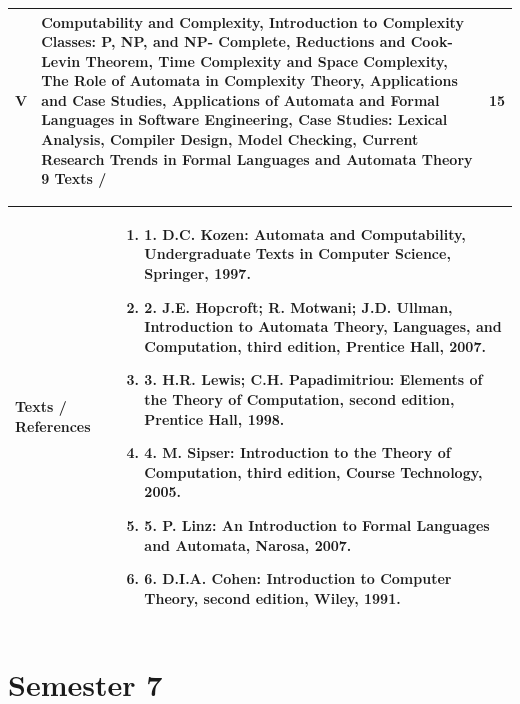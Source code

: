 \documentclass[11pt,a4paper]{article}
\begin{document}
\begin{tabularx}{\textwidth}{|>{\centering\arraybackslash}p{1.4cm}|X|>{\centering\arraybackslash}p{2.4cm}|}
\hline
\Large \textbf{V} & Computability and Complexity, Introduction to Complexity Classes: P, NP, and NP- Complete, Reductions and Cook-Levin Theorem, Time Complexity and Space Complexity, The Role of Automata in Complexity Theory, Applications and Case Studies, Applications of Automata and Formal Languages in Software Engineering, Case Studies: Lexical Analysis, Compiler Design, Model Checking, Current Research Trends in Formal Languages and Automata Theory 9 Texts / & \Large \textbf{15} \\
\hline
\end{tabularx}
\vspace{8pt}
\renewcommand{\arraystretch}{1.3}
\begin{tabularx}{\textwidth}{|p{3.2cm}|X|}
\hline
\textbf{Texts / References} & \begin{enumerate}[leftmargin=*,noitemsep,topsep=2pt]  \item 1. D.C. Kozen: Automata and Computability, Undergraduate Texts in Computer Science,  Springer, 1997.  \item 2. J.E. Hopcroft; R. Motwani; J.D. Ullman, Introduction to Automata Theory, Languages, and  Computation, third edition, Prentice Hall, 2007.  \item 3. H.R. Lewis; C.H. Papadimitriou: Elements of the Theory of Computation, second edition,  Prentice Hall, 1998.  \item 4. M. Sipser: Introduction to the Theory of Computation, third edition, Course Technology, 2005.  \item 5. P. Linz: An Introduction to Formal Languages and Automata, Narosa, 2007.  \item 6. D.I.A. Cohen: Introduction to Computer Theory, second edition, Wiley, 1991.\end{enumerate} \\
\hline
\end{tabularx}
\clearpage
\section{Semester 7}
\vspace{10pt}
\clearpage
\end{document}
